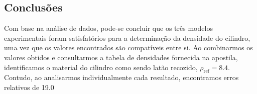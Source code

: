 \documentclass{article}
\begin{document}
\begin{multicols}{2}
\section{Conclusões}
Com base na análise de dados, pode-se concluir que os três modelos experimentais foram satisfatórios para a determinação da densidade do cilindro, uma vez que os valores encontrados são compatíveis entre si. Ao combinarmos os valores obtidos e consultarmos a tabela de densidades fornecida na apostila, identificamos o material do cilindro como sendo latão recozido, $\rho_{\text{ref}} = 8.4$. Contudo, ao analisarmos individualmente cada resultado, encontramos erros relativos de 19.0%

\end{multicols}
\end{document}
